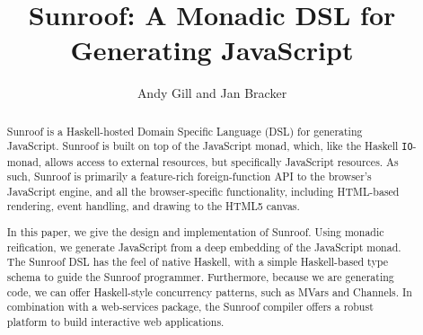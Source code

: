 \documentclass{llncs}
\newcommand{\Src}[1]{{\tt{#1}}}
\newcommand{\IO}{\Src{IO}}
\begin{document}
%
\title{Sunroof: A Monadic DSL for Generating JavaScript}
%
%
\author{Andy Gill and Jan Bracker}
%
%
%

\maketitle

\begin{abstract}        
Sunroof is a Haskell-hosted Domain Specific Language (DSL) for generating JavaScript.
Sunroof is built on top of the JavaScript monad, which, like the Haskell \IO-monad, allows 
access to external resources, but specifically JavaScript
resources. As such, Sunroof is primarily a feature-rich 
foreign-function API to the browser's JavaScript engine, and all the browser-specific
functionality, including HTML-based rendering, event handling, and 
drawing to the HTML5 canvas. 

In this paper, we give the design and implementation of Sunroof.
Using monadic reification, we generate JavaScript from
a deep embedding of the JavaScript monad.
The Sunroof DSL has the feel of native Haskell, with a simple
Haskell-based type schema to guide the Sunroof programmer.
Furthermore, because we are generating code,
we can offer Haskell-style concurrency patterns, such as MVars and Channels.
In combination with a web-services package,
the Sunroof compiler offers a robust platform to build interactive web applications.

\end{abstract}
%
\end{document}
